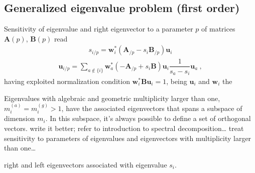 \documentclass[letterpaper,10pt,english]{jupyterBook}
\begin{document}
\subsection{Generalized eigenvalue problem (first order)}
\label{\detokenize{ch/linear-algebra/spectral-sensitivity:generalized-eigenvalue-problem-first-order}}\label{\detokenize{ch/linear-algebra/spectral-sensitivity:math-spectral-sensitivity-first-order}}
\sphinxAtStartPar
Sensitivity of eigenvalue and right eigenvector to a parameter \(p\) of matrices \(\mathbf{A}(p)\), \(\mathbf{B}(p)\) read
\begin{equation}\label{equation:ch/linear-algebra/spectral-sensitivity:eq:eig:sens:first:eigenvalue}
\begin{split}s_{i/p} = \mathbf{w}_i^* \left( \mathbf{A}_{/p} - s_i \mathbf{B}_{/p} \right) \mathbf{u}_i \end{split}
\end{equation}\begin{equation*}
\begin{split}\mathbf{u}_{i/p} = \sum_{a \notin \{i\}} \mathbf{w}_a^* \left( - \mathbf{A}_{/p} + s_i \mathbf{B} \right) \mathbf{u}_i \dfrac{1}{s_a - s_i} \mathbf{u}_a \ ,\end{split}
\end{equation*}
\sphinxAtStartPar
having exploited normalization condition \(\mathbf{w}_i^* \mathbf{B} \mathbf{u}_i = 1\), being \(\mathbf{u}_i\) and \(\mathbf{w}_i\) the%
\begin{footnote}[2]\sphinxAtStartFootnote
Eigenvalues with algebraic and geometric multiplicity larger than one, \(m_i^{(a)} = m_i^{(g)} > 1\), have the associated eigenvectors that spans a subspace of dimension \(m_i\). In this subspace, it’s always possible to define a set of orthogonal vectors.  write it better; refer to introduction to spectral decomposition…  treat sensitivity to parameters of eigenvalues and eigenvectors with multiplicity larger than one…
%
\end{footnote} right and left eigenvectors associated with eigenvalue \(s_i\).
\end{document}
